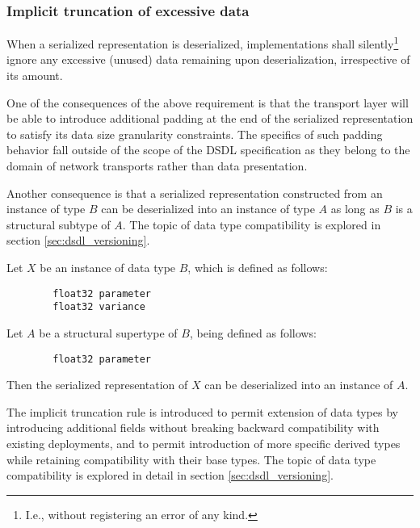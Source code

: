 \subsubsection{Implicit truncation of excessive data}

When a serialized representation is deserialized, implementations shall silently\footnote{%
    I.e., without registering an error of any kind.
} ignore any excessive (unused) data remaining upon deserialization, irrespective of its amount.

One of the consequences of the above requirement is that the transport layer will be able to introduce
additional padding at the end of the serialized representation to satisfy its data size granularity constraints.
The specifics of such padding behavior fall outside of the scope of the DSDL specification
as they belong to the domain of network transports rather than data presentation.

Another consequence is that a serialized representation constructed from an instance of type $B$ can be
deserialized into an instance of type $A$ as long as $B$ is a structural subtype of $A$.
The topic of data type compatibility is explored in section \ref{sec:dsdl_versioning}.

\begin{remark}
    Let $X$ be an instance of data type $B$, which is defined as follows:

    \begin{verbatim}
        float32 parameter
        float32 variance
    \end{verbatim}

    Let $A$ be a structural supertype of $B$, being defined as follows:

    \begin{verbatim}
        float32 parameter
    \end{verbatim}

    Then the serialized representation of $X$ can be deserialized into an instance of $A$.

    The implicit truncation rule is introduced to permit extension of data types by introducing additional fields
    without breaking backward compatibility with existing deployments,
    and to permit introduction of more specific derived types while retaining compatibility with their base types.
    The topic of data type compatibility is explored in detail in section \ref{sec:dsdl_versioning}.
\end{remark}

